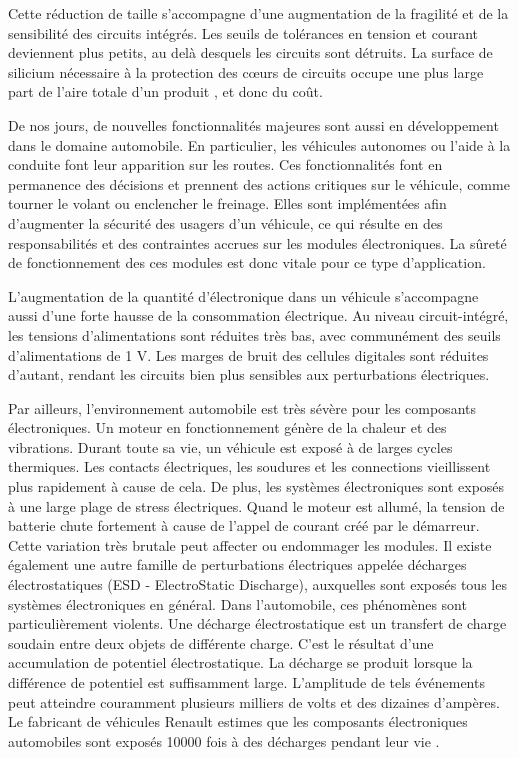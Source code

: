 Cette réduction de taille s'accompagne d'une augmentation de la fragilité et de la sensibilité des circuits intégrés.
Les seuils de tolérances en tension et courant deviennent plus petits, au delà desquels les circuits sont détruits.
La surface de silicium nécessaire à la protection des cœurs de circuits occupe une plus large part de l'aire totale d'un produit  \cite{evolution_technologies}, et donc du coût.

De nos jours, de nouvelles fonctionnalités majeures sont aussi en développement dans le domaine automobile.
En particulier, les véhicules autonomes ou l'aide à la conduite font leur apparition sur les routes.
Ces fonctionnalités font en permanence des décisions et prennent des actions critiques sur le véhicule, comme tourner le volant ou enclencher le freinage.
Elles sont implémentées afin d'augmenter la sécurité des usagers d'un véhicule, ce qui résulte en des responsabilités et des contraintes accrues sur les modules électroniques.
La sûreté de fonctionnement des ces modules est donc vitale pour ce type d'application.

L'augmentation de la quantité d'électronique dans un véhicule s'accompagne aussi d'une forte hausse de la consommation électrique.
Au niveau circuit-intégré, les tensions d'alimentations sont réduites très bas, avec communément des seuils d'alimentations de 1 V.
Les marges de bruit des cellules digitales sont réduites d'autant, rendant les circuits bien plus sensibles aux perturbations électriques.

Par ailleurs, l'environnement automobile est très sévère pour les composants électroniques.
Un moteur en fonctionnement génère de la chaleur et des vibrations.
Durant toute sa vie, un véhicule est exposé à de larges cycles thermiques.
Les contacts électriques, les soudures et les connections vieillissent plus rapidement à cause de cela.
De plus, les systèmes électroniques sont exposés à une large plage de stress électriques.
Quand le moteur est allumé, la tension de batterie chute fortement à cause de l'appel de courant créé par le démarreur.
Cette variation très brutale peut affecter ou endommager les modules.
Il existe également une autre famille de perturbations électriques appelée décharges électrostatiques (ESD - ElectroStatic Discharge), auxquelles sont exposés tous les systèmes électroniques en général.
Dans l'automobile, ces phénomènes sont particulièrement violents.
Une décharge électrostatique est un transfert de charge soudain entre deux objets de différente charge.
C'est le résultat d'une accumulation de potentiel électrostatique.
La décharge se produit lorsque la différence de potentiel est suffisamment large.
L'amplitude de tels événements peut atteindre couramment plusieurs milliers de volts et des dizaines d'ampères.
Le fabricant de véhicules Renault estimes que les composants électroniques automobiles sont exposés 10000 fois à des décharges pendant leur vie \cite{Renault-esd}.

